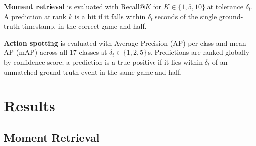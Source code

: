 \documentclass[10pt,twocolumn]{article}
\begin{document}
\noindent\textbf{Moment retrieval} is evaluated with Recall@$K$ for $K \in \{1, 5, 10\}$ at tolerance $\delta_t$. A prediction at rank $k$ is a hit if it falls within $\delta_t$ seconds of the single ground-truth timestamp, in the correct game and half.

\noindent\textbf{Action spotting} is evaluated with Average Precision (AP) per class and mean AP (mAP) across all 17 classes at $\delta_t \in \{1, 2, 5\}$\,s. Predictions are ranked globally by confidence score; a prediction is a true positive if it lies within $\delta_t$ of an unmatched ground-truth event in the same game and half.

\section{Results}

\subsection{Moment Retrieval}

\begin{table}[t]
  \centering
  \caption{Moment retrieval at $\delta_t = 5\,\text{s}$. $^\dagger$98-game test index. $^\ddagger$471-game full cross-video index.}
  \label{tab:retrieval}
\end{table}
\end{document}
